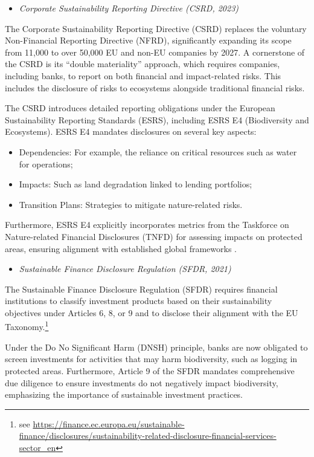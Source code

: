 \documentclass[
  authoryear]{elsarticle}
\providecommand{\tightlist}{%
  \setlength{\itemsep}{0pt}\setlength{\parskip}{0pt}}\usepackage{longtable,booktabs,array}
\begin{document}
\begin{itemize}
\tightlist
\item
  \emph{Corporate Sustainability Reporting Directive (CSRD, 2023)}
\end{itemize}

The Corporate Sustainability Reporting Directive (CSRD) replaces the
voluntary Non-Financial Reporting Directive (NFRD), significantly
expanding its scope from 11,000 to over 50,000 EU and non-EU companies
by 2027. A cornerstone of the CSRD is its ``double materiality''
approach, which requires companies, including banks, to report on both
financial and impact-related risks. This includes the disclosure of
risks to ecosystems alongside traditional financial risks.

The CSRD introduces detailed reporting obligations under the European
Sustainability Reporting Standards (ESRS), including ESRS E4
(Biodiversity and Ecosystems). ESRS E4 mandates disclosures on several
key aspects:

\begin{itemize}
\tightlist
\item
  Dependencies: For example, the reliance on critical resources such as
  water for operations;
\item
  Impacts: Such as land degradation linked to lending portfolios;
\item
  Transition Plans: Strategies to mitigate nature-related risks.
\end{itemize}

Furthermore, ESRS E4 explicitly incorporates metrics from the Taskforce
on Nature-related Financial Disclosures (TNFD) for assessing impacts on
protected areas, ensuring alignment with established global frameworks
\citep[see][]{EFRAG2022}.

\begin{itemize}
\tightlist
\item
  \emph{Sustainable Finance Disclosure Regulation (SFDR, 2021)}
\end{itemize}

The Sustainable Finance Disclosure Regulation (SFDR) requires financial
institutions to classify investment products based on their
sustainability objectives under Articles 6, 8, or 9 and to disclose
their alignment with the EU Taxonomy.\footnote{see
  \url{https://finance.ec.europa.eu/sustainable-finance/disclosures/sustainability-related-disclosure-financial-services-sector_en}}

Under the Do No Significant Harm (DNSH) principle, banks are now
obligated to screen investments for activities that may harm
biodiversity, such as logging in protected areas. Furthermore, Article 9
of the SFDR mandates comprehensive due diligence to ensure investments
do not negatively impact biodiversity, emphasizing the importance of
sustainable investment practices.
\end{document}
